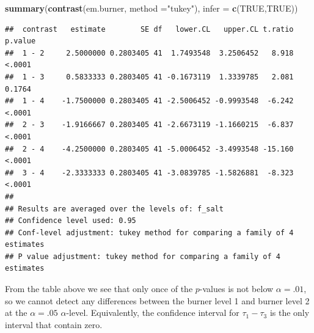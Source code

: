 \documentclass[12pt,]{article}
\newenvironment{Shaded}{\begin{snugshade}}{\end{snugshade}}
\newcommand{\KeywordTok}[1]{\textcolor[rgb]{0.13,0.29,0.53}{\textbf{#1}}}
\newcommand{\DataTypeTok}[1]{\textcolor[rgb]{0.13,0.29,0.53}{#1}}
\newcommand{\StringTok}[1]{\textcolor[rgb]{0.31,0.60,0.02}{#1}}
\newcommand{\OtherTok}[1]{\textcolor[rgb]{0.56,0.35,0.01}{#1}}
\newcommand{\NormalTok}[1]{#1}
\begin{document}
\begin{Shaded}
\begin{Highlighting}[]
\KeywordTok{summary}\NormalTok{(}\KeywordTok{contrast}\NormalTok{(em.burner, }\DataTypeTok{method =}\StringTok{"tukey"}\NormalTok{), }\DataTypeTok{infer =} \KeywordTok{c}\NormalTok{(}\OtherTok{TRUE}\NormalTok{,}\OtherTok{TRUE}\NormalTok{))}
\end{Highlighting}
\end{Shaded}

\begin{verbatim}
##  contrast   estimate        SE df   lower.CL   upper.CL t.ratio p.value
##  1 - 2     2.5000000 0.2803405 41  1.7493548  3.2506452   8.918  <.0001
##  1 - 3     0.5833333 0.2803405 41 -0.1673119  1.3339785   2.081  0.1764
##  1 - 4    -1.7500000 0.2803405 41 -2.5006452 -0.9993548  -6.242  <.0001
##  2 - 3    -1.9166667 0.2803405 41 -2.6673119 -1.1660215  -6.837  <.0001
##  2 - 4    -4.2500000 0.2803405 41 -5.0006452 -3.4993548 -15.160  <.0001
##  3 - 4    -2.3333333 0.2803405 41 -3.0839785 -1.5826881  -8.323  <.0001
## 
## Results are averaged over the levels of: f_salt 
## Confidence level used: 0.95 
## Conf-level adjustment: tukey method for comparing a family of 4 estimates 
## P value adjustment: tukey method for comparing a family of 4 estimates
\end{verbatim}

From the table above we see that only once of the \(p\)-values is not
below \(\alpha = .01\), so we cannot detect any differences between the
burner level 1 and burner level 2 at the \(\alpha=.05\)
\(\alpha\)-level. Equivalently, the confidence interval for
\(\tau_1 - \tau_3\) is the only interval that contain zero.
\end{document}
